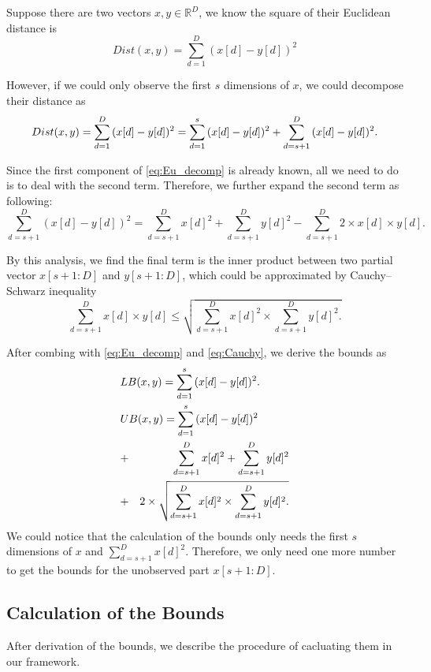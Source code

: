 Suppose there are two vectors $x,y\in \mathbb{R}^D$, we know the square of their Euclidean distance is 
\begin{equation}
	Dist(x,y)=\sum^D_{d=1}{(x[d]-y[d])^2}
\end{equation}

However, if we could only observe the first $s$ dimensions of $x$, we could decompose their distance as 
\begin{equation}\label{eq:Eu_decomp}
	Dist(x,y)=\sum^D_{d=1}{(x[d]-y[d])^2}\\
				=\sum^s_{d=1}{(x[d]-y[d])^2} + \sum^D_{d=s+1}{(x[d]-y[d])^2.}	
\end{equation}

Since the first component of \eqref{eq:Eu_decomp} is already known, all we need to do is to deal with the second term. Therefore, we further expand the second term as following:
\[
\sum^D_{d=s+1}{(x[d]-y[d])^2}=\sum^D_{d=s+1}{x[d]^2}+\sum^D_{d=s+1}{y[d]^2}-\sum^D_{d=s+1}{2\times x[d]\times y[d].}
\]

By this analysis, we find the final term is the inner product between two partial vector $x[s+1:D]$ and $y[s+1:D]$, which could be approximated by Cauchy–Schwarz inequality
\begin{equation}\label{eq:Cauchy}
	\sum^D_{d=s+1}{x[d]\times y[d]} \leq \sqrt{\sum^D_{d=s+1}{x[d]^2}\times \sum^D_{d=s+1}{y[d]^2}.}
\end{equation}

After combing with \eqref{eq:Eu_decomp} and \eqref{eq:Cauchy}, we derive the bounds as 
{
\begin{eqnarray}
\lefteqn{LB(x,y) = \sum^s_{d=1}{(x[d]-y[d])^2}.} \label{eq:single-LB} \\
\lefteqn{UB(x,y) = \sum^s_{d=1}{(x[d]-y[d])^2}} \notag \\
& + & \sum^D_{d=s+1}{x[d]^2}+\sum^D_{d=s+1}{y[d]^2} \notag \\
& + & 2 \times \sqrt{\sum^D_{d=s+1}{x[d]^2}\times \sum^D_{d=s+1}{y[d]^2}.}\label{eq:single-UB}
\end{eqnarray}
}
We could notice that the calculation of the bounds only needs the first $s$ dimensions of $x$ and $\sum^D_{d=s+1}{x[d]^2}$.  Therefore, we only need one more number to get the bounds for the unobserved part $x[s+1:D]$.


\subsection{Calculation of the Bounds} %
\label{sub:calculation_the_bounds}
After derivation of the bounds, we describe the procedure of cacluating them in our framework.  

